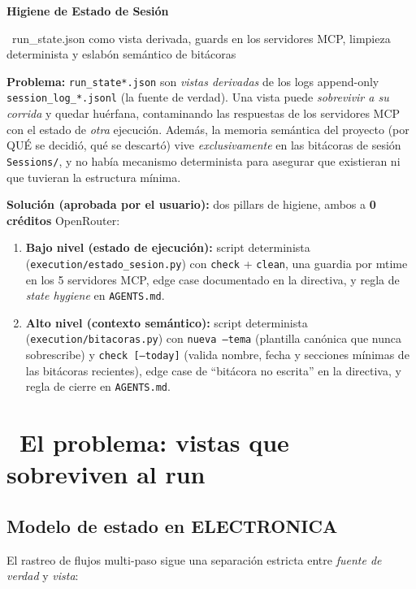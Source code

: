 \documentclass[11pt,a4paper]{article}
\newcommand{\iconoBanda}{microchip}
\newcommand{\bandaTitulo}[3][fondoOscuro]{%
  \begin{tcolorbox}[
    enhanced,
    colback=#1, colframe=#1,
    boxrule=0pt, arc=8pt, outer arc=8pt,
    width=\linewidth,
    top=18pt, bottom=6pt, left=14pt, right=14pt,
    borderline south={3.5pt}{0pt}{cyanNeon},
  ]
    \begin{minipage}[c]{0.07\linewidth}
      \centering
      \textcolor{cyanNeon}{\fontsize{30}{30}\selectfont\faIcon{\iconoBanda}}
    \end{minipage}%
    \hspace{8pt}%
    \begin{minipage}[c]{0.88\linewidth}
      {\fontsize{20}{24}\selectfont\bfseries\color{white}#2}\par\vspace{5pt}%
      \textcolor{cyanNeon!80!white}{\small\faIcon{angle-right}~#3}%
    \end{minipage}
    \vspace{4pt}
  \end{tcolorbox}%
  \vspace{8pt}%
}
\newcommand{\iconotexto}[2]{\textcolor{cyanNeon}{\faIcon{#1}}~#2}
\begin{document}
\renewcommand{\iconoBanda}{shield-alt}
\bandaTitulo[fondoOscuro]{Higiene de Estado de Sesión}{run\_state.json como vista derivada, guards en los servidores MCP, limpieza determinista y eslabón semántico de bitácoras}

\vspace{4pt}
\begin{tcolorbox}[cajaTitulo, title=Resumen ejecutivo]
\textbf{Problema:} \texttt{run\_state*.json} son \emph{vistas derivadas} de los logs
append-only \texttt{session\_log\_*.jsonl} (la fuente de verdad). Una vista puede
\emph{sobrevivir a su corrida} y quedar huérfana, contaminando las respuestas de los
servidores MCP con el estado de \emph{otra} ejecución. Además, la memoria semántica
del proyecto (por QUÉ se decidió, qué se descartó) vive \emph{exclusivamente} en
las bitácoras de sesión \texttt{Sessions/}, y no había mecanismo determinista para
asegurar que existieran ni que tuvieran la estructura mínima.

\textbf{Solución (aprobada por el usuario):} dos pillars de higiene, ambos a
\textbf{0 créditos} OpenRouter:
\begin{enumerate}[leftmargin=*]
  \item \textbf{Bajo nivel (estado de ejecución):} script determinista
        (\texttt{execution/estado\_sesion.py}) con \texttt{check} + \texttt{clean},
        una guardia por mtime en los 5 servidores MCP, edge case documentado en la
        directiva, y regla de \emph{state hygiene} en \texttt{AGENTS.md}.
  \item \textbf{Alto nivel (contexto semántico):} script determinista
        (\texttt{execution/bitacoras.py}) con \texttt{nueva --tema} (plantilla
        canónica que nunca sobrescribe) y \texttt{check [--today]} (valida nombre,
        fecha y secciones mínimas de las bitácoras recientes), edge case de ``bitácora
        no escrita'' en la directiva, y regla de cierre en \texttt{AGENTS.md}.
\end{enumerate}
\end{tcolorbox}

\section{\iconotexto{bullseye}{El problema: vistas que sobreviven al run}}

\subsection{Modelo de estado en ELECTRONICA}
El rastreo de flujos multi-paso sigue una separación estricta entre \emph{fuente de
verdad} y \emph{vista}:
\end{document}
